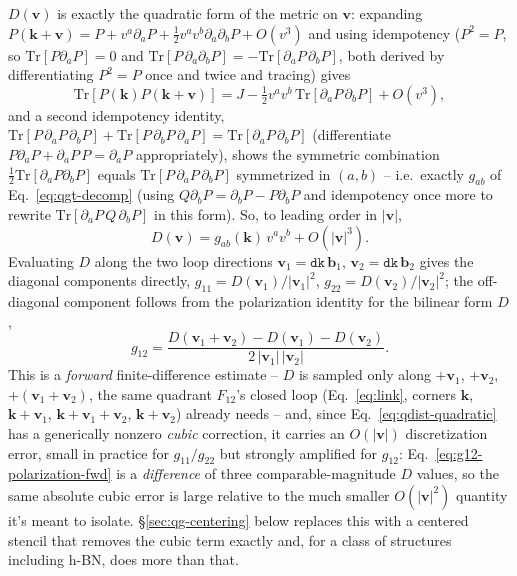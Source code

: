 \documentclass[11pt]{article}
\begin{document}
$D(\mathbf v)$ is exactly the quadratic form of the metric on $\mathbf v$: expanding
$P(\mathbf k+\mathbf v) = P + v^a\partial_a P + \tfrac12 v^av^b\partial_a\partial_b P +
O(v^3)$ and using idempotency ($P^2=P$, so $\mathrm{Tr}[P\partial_a P]=0$ and
$\mathrm{Tr}[P\,\partial_a\partial_b P] = -\mathrm{Tr}[\partial_a P\,\partial_b P]$, both
derived by differentiating $P^2=P$ once and twice and tracing) gives
\begin{equation}
  \mathrm{Tr}[P(\mathbf k)P(\mathbf k+\mathbf v)] = J - \tfrac12 v^a v^b\,
    \mathrm{Tr}[\partial_a P\,\partial_b P] + O(v^3),
\end{equation}
and a second idempotency identity, $\mathrm{Tr}[P\,\partial_aP\,\partial_bP] +
\mathrm{Tr}[P\,\partial_bP\,\partial_aP] = \mathrm{Tr}[\partial_aP\,\partial_bP]$
(differentiate $P\partial_aP+\partial_aP\,P=\partial_aP$ appropriately), shows the
symmetric combination $\tfrac12\mathrm{Tr}[\partial_aP\partial_bP]$ equals
$\mathrm{Tr}[P\,\partial_aP\,\partial_bP]$ symmetrized in $(a,b)$ -- i.e.\ exactly
$g_{ab}$ of Eq.~\eqref{eq:qgt-decomp} (using $Q\partial_bP = \partial_bP - P\partial_bP$
and idempotency once more to rewrite $\mathrm{Tr}[\partial_aP\,Q\,\partial_bP]$ in this
form). So, to leading order in $|\mathbf v|$,
\begin{equation}
  D(\mathbf v) = g_{ab}(\mathbf k)\, v^a v^b + O(|\mathbf v|^3).
  \label{eq:qdist-quadratic}
\end{equation}
Evaluating $D$ along the two loop directions $\mathbf v_1=\texttt{dk}\,\mathbf b_1$,
$\mathbf v_2=\texttt{dk}\,\mathbf b_2$ gives the diagonal components directly,
$g_{11}=D(\mathbf v_1)/|\mathbf v_1|^2$, $g_{22}=D(\mathbf v_2)/|\mathbf v_2|^2$; the
off-diagonal component follows from the polarization identity for the bilinear form
$D$,
\begin{equation}
  g_{12} = \frac{D(\mathbf v_1+\mathbf v_2) - D(\mathbf v_1) - D(\mathbf v_2)}
    {2\,|\mathbf v_1|\,|\mathbf v_2|}.
  \label{eq:g12-polarization-fwd}
\end{equation}
This is a \emph{forward} finite-difference estimate -- $D$ is sampled only along $+\mathbf
v_1$, $+\mathbf v_2$, $+(\mathbf v_1+\mathbf v_2)$, the same quadrant $F_{12}$'s closed
loop (Eq.~\eqref{eq:link}, corners $\mathbf k$, $\mathbf k+\mathbf v_1$, $\mathbf
k+\mathbf v_1+\mathbf v_2$, $\mathbf k+\mathbf v_2$) already needs -- and, since
Eq.~\eqref{eq:qdist-quadratic} has a generically nonzero \emph{cubic} correction, it
carries an $O(|\mathbf v|)$ discretization error, small in practice for $g_{11}/g_{22}$
but strongly amplified for $g_{12}$: Eq.~\eqref{eq:g12-polarization-fwd} is a
\emph{difference} of three comparable-magnitude $D$ values, so the same absolute cubic
error is large relative to the much smaller $O(|\mathbf v|^2)$ quantity it's meant to
isolate. \S\ref{sec:qg-centering} below replaces this with a centered stencil that
removes the cubic term exactly and, for a class of structures including h-BN,
does more than that.
\end{document}

